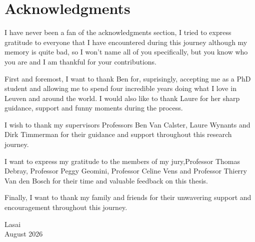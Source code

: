 \chapter*{Acknowledgments}

I have never been a fan of the acknowledgments section, I tried to express gratitude to everyone that I have encountered during this journey although my memory is quite bad, so I won't name all of you specifically, but you know who you are and I am thankful for your contributions. 

First and foremost, I want to thank Ben for, suprisingly, accepting me as a PhD student and allowing me to spend four incredible years doing what I love in Leuven and around the world. I would also like to thank Laure for her sharp guidance, support and funny moments during the process.

I wish to thank my supervisors Professors Ben Van Calster, Laure Wynants and Dirk Timmerman for their guidance and support throughout this research journey. 

I want to express my gratitude to the members of my jury,Professor Thomas Debray, Professor Peggy Geomini, Professor Celine Vens and Professor Thierry Van den Bosch for their time and valuable feedback on this thesis.

Finally, I want to thank my family and friends for their unwavering support and encouragement throughout this journey.





{\raggedleft
Lasai \\
August 2026 \\
}